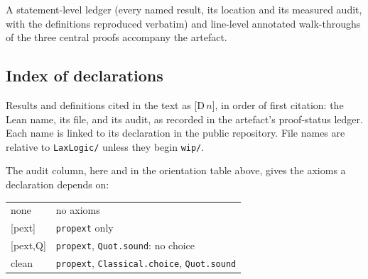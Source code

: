 \medskip
\noindent A statement-level ledger (every named result, its location and
its measured audit, with the definitions reproduced verbatim) and
line-level annotated walk-throughs of the three central proofs
accompany the artefact.

\subsection*{Index of declarations}\label{app:index}

Results and definitions cited in the text as [D\,$n$], in order of first
citation: the Lean name, its file, and its audit, as recorded in the
artefact's proof-status ledger. Each name is linked to its declaration in
the public repository. File names are relative to \texttt{LaxLogic/}
unless they begin \texttt{wip/}.

\medskip
\noindent The audit column, here and in the orientation table above, gives
the axioms a declaration depends on:

\begin{center}\small
\begin{tabular}{@{}ll@{}}
\toprule
none & no axioms \\
{[pext]} & \texttt{propext} only \\
{[pext,Q]} & \texttt{propext}, \texttt{Quot.sound}: no choice \\
clean & \texttt{propext}, \texttt{Classical.choice}, \texttt{Quot.sound} \\
\bottomrule
\end{tabular}
\end{center}

